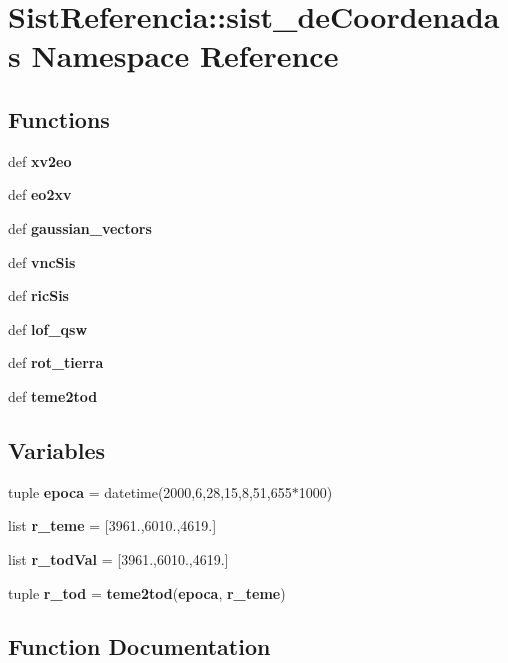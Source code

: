 \section{\-Sist\-Referencia\-:\-:sist\-\_\-de\-Coordenadas \-Namespace \-Reference}
\label{namespace_sist_referencia_1_1sist__de_coordenadas}
\subsection*{\-Functions}
\begin{DoxyCompactItemize}
\item 
def {\bf xv2eo}
\item 
def {\bf eo2xv}
\item 
def {\bf gaussian\-\_\-vectors}
\item 
def {\bf vnc\-Sis}
\item 
def {\bf ric\-Sis}
\item 
def {\bf lof\-\_\-qsw}
\item 
def {\bf rot\-\_\-tierra}
\item 
def {\bf teme2tod}
\end{DoxyCompactItemize}
\subsection*{\-Variables}
\begin{DoxyCompactItemize}
\item 
tuple {\bf epoca} = datetime(2000,6,28,15,8,51,655$\ast$1000)
\item 
list {\bf r\-\_\-teme} = [3961.,6010.,4619.]
\item 
list {\bf r\-\_\-tod\-Val} = [3961.,6010.,4619.]
\item 
tuple {\bf r\-\_\-tod} = {\bf teme2tod}({\bf epoca}, {\bf r\-\_\-teme})
\end{DoxyCompactItemize}


\subsection{\-Function \-Documentation}
